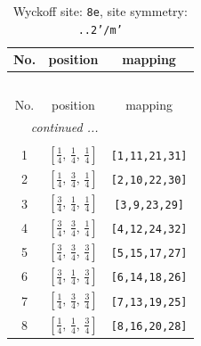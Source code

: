 \documentclass[fleqn,8pt]{jsarticle}
\begin{document}
\renewcommand{\arraystretch}{1.2}
\begin{longtable}{ccc}
\caption{Wyckoff site: {\tt 8e}, site symmetry: {\tt ..2'/m'}}
 \\
 \hline \hline
No. & position & mapping \\ \hline \endfirsthead

\multicolumn{2}{l}{\tablename\ \thetable{}} \\
 \hline \hline
No. & position & mapping \\ \hline \endhead

 \hline \hline
\multicolumn{2}{r}{\footnotesize\it continued ...} \\ \endfoot

 \hline \hline
\multicolumn{2}{r}{} \\ \endlastfoot

1 & $\left[ \frac{1}{4},\, \frac{1}{4},\, \frac{1}{4} \right]$ & {\tt [1,11,21,31]} \\ \hline
2 & $\left[ \frac{1}{4},\, \frac{3}{4},\, \frac{1}{4} \right]$ & {\tt [2,10,22,30]} \\ \hline
3 & $\left[ \frac{3}{4},\, \frac{1}{4},\, \frac{1}{4} \right]$ & {\tt [3,9,23,29]} \\ \hline
4 & $\left[ \frac{3}{4},\, \frac{3}{4},\, \frac{1}{4} \right]$ & {\tt [4,12,24,32]} \\ \hline
5 & $\left[ \frac{3}{4},\, \frac{3}{4},\, \frac{3}{4} \right]$ & {\tt [5,15,17,27]} \\ \hline
6 & $\left[ \frac{3}{4},\, \frac{1}{4},\, \frac{3}{4} \right]$ & {\tt [6,14,18,26]} \\ \hline
7 & $\left[ \frac{1}{4},\, \frac{3}{4},\, \frac{3}{4} \right]$ & {\tt [7,13,19,25]} \\ \hline
8 & $\left[ \frac{1}{4},\, \frac{1}{4},\, \frac{3}{4} \right]$ & {\tt [8,16,20,28]} \\
\end{longtable}
\renewcommand{\arraystretch}{1.2}
\end{document}
